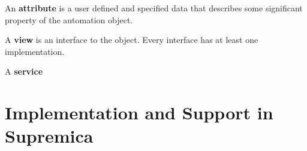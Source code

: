An \textbf{attribute} is a user defined and specified data that
describes some significant property of the automation
object. 

A \textbf{view} is an interface to the object. Every
interface has at least one implementation.


A \textbf{service} 








\section{Implementation and Support in Supremica}









